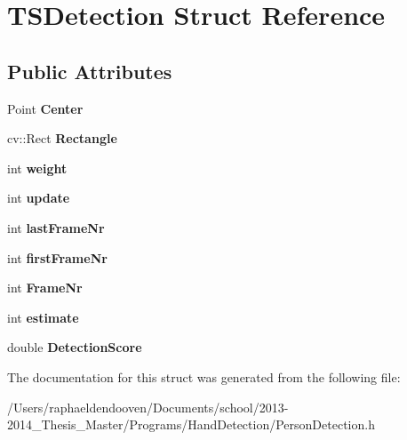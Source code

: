 \hypertarget{struct_t_s_detection}{\section{T\-S\-Detection Struct Reference}
\label{struct_t_s_detection}
}
\subsection*{Public Attributes}
\begin{DoxyCompactItemize}
\item 
\hypertarget{struct_t_s_detection_a073122df145365ca9162a817518b58e1}{Point {\bfseries Center}}\label{struct_t_s_detection_a073122df145365ca9162a817518b58e1}

\item 
\hypertarget{struct_t_s_detection_ae9ebe68d69098649d7010084524e8d00}{cv\-::\-Rect {\bfseries Rectangle}}\label{struct_t_s_detection_ae9ebe68d69098649d7010084524e8d00}

\item 
\hypertarget{struct_t_s_detection_aec6c04ef8c8bf464db2b6a04ada19646}{int {\bfseries weight}}\label{struct_t_s_detection_aec6c04ef8c8bf464db2b6a04ada19646}

\item 
\hypertarget{struct_t_s_detection_a100120abd1ce8f939de27406dbbeb334}{int {\bfseries update}}\label{struct_t_s_detection_a100120abd1ce8f939de27406dbbeb334}

\item 
\hypertarget{struct_t_s_detection_afc802f63d07908f4f9865f6c4d680b25}{int {\bfseries last\-Frame\-Nr}}\label{struct_t_s_detection_afc802f63d07908f4f9865f6c4d680b25}

\item 
\hypertarget{struct_t_s_detection_a57479a3d8734ed77c282bd0e5fae5a3e}{int {\bfseries first\-Frame\-Nr}}\label{struct_t_s_detection_a57479a3d8734ed77c282bd0e5fae5a3e}

\item 
\hypertarget{struct_t_s_detection_a843280e254b7d41f05829452f35fb8e3}{int {\bfseries Frame\-Nr}}\label{struct_t_s_detection_a843280e254b7d41f05829452f35fb8e3}

\item 
\hypertarget{struct_t_s_detection_ac0060de8674cb21f138b0b6c968f76e4}{int {\bfseries estimate}}\label{struct_t_s_detection_ac0060de8674cb21f138b0b6c968f76e4}

\item 
\hypertarget{struct_t_s_detection_adb44dab560d6a607fa363e8ade26eb26}{double {\bfseries Detection\-Score}}\label{struct_t_s_detection_adb44dab560d6a607fa363e8ade26eb26}

\end{DoxyCompactItemize}


The documentation for this struct was generated from the following file\-:\begin{DoxyCompactItemize}
\item 
/\-Users/raphaeldendooven/\-Documents/school/2013-\/2014\-\_\-\-Thesis\-\_\-\-Master/\-Programs/\-Hand\-Detection/Person\-Detection.\-h\end{DoxyCompactItemize}
